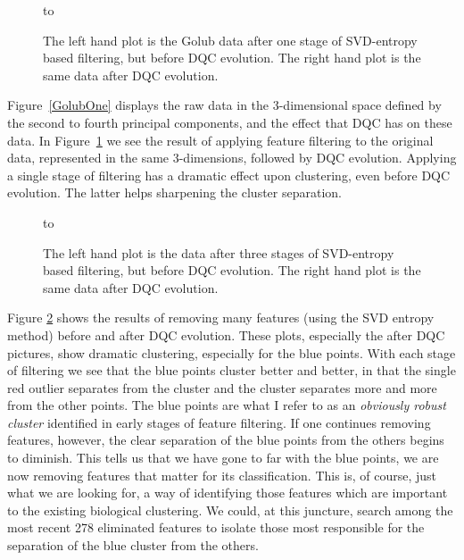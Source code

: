 \documentclass[fleqn,twoside]{article}
\begin{document}
\begin{figure}[h!]
   \hbox to 
  \caption{The left hand plot is the Golub data after one stage
  of SVD-entropy based filtering, but before DQC evolution.  The right
  hand plot is the same data after DQC evolution.
   }
\label{GolubTwo}
\end{figure}
Figure~\ref{GolubOne} displays the raw data in the 3-dimensional
space defined by the second to fourth principal components,
and the effect that DQC has on these
data. In Figure~\ref{GolubTwo} we see the result of applying feature
filtering to the original data, represented in the same
3-dimensions, followed by DQC evolution.  Applying a single stage of
filtering has a dramatic effect upon clustering, even before DQC
evolution. The latter helps sharpening the cluster separation.
\begin{figure}[h]
   \hbox to 
  \caption{The left hand plot is the data after three stages
  of SVD-entropy based filtering, but before DQC evolution.  The right
  hand plot is the same data after DQC evolution.
   }
\label{GolubThree}
\end{figure}
Figure \ref{GolubThree} shows the results of removing many features
(using the SVD entropy method) before and after DQC evolution. These
plots, especially the after DQC pictures, show dramatic clustering,
especially for the blue points.  With each stage of filtering we see
that the blue points cluster better and better, in that the single
red outlier separates from the cluster and the cluster separates
more and more from the other points.  The blue points are what I
refer to as an {\it obviously robust cluster\/} identified in early
stages of feature filtering. If one continues removing features,
however, the clear separation of the blue points from the others
begins to diminish. This tells us that we have gone to far with the
blue points, we are now removing features that matter for its
classification. This is, of course, just what we are looking for, a
way of identifying those features which are important to the
existing biological clustering. We could, at this juncture, search
among the most recent 278 eliminated features to isolate those most
responsible for the separation of the blue cluster from the others.
\end{document}
